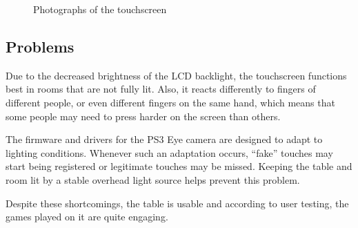 \documentclass[a4paper,12pt]{article}
\begin{document}
\begin{figure}[p]\small
{}
\hspace{1em}
\caption{Photographs of the touchscreen}
\end{figure}

\subsection{Problems}

Due to the decreased brightness of the LCD backlight, the touchscreen functions
best in rooms that are not fully lit.
Also, it reacts differently to fingers of different people, or even different
fingers on the same hand, which means that some people may need to press harder
on the screen than others.

The firmware and drivers for the PS3 Eye camera are designed to adapt to
lighting conditions.
Whenever such an adaptation occurs, “fake” tou\-ches may start being registered
or legitimate touches may be missed.
Keeping the table and room lit by a stable overhead light source helps prevent
this problem.

Despite these shortcomings, the table is usable and according to user testing,
the games played on it are quite engaging.

\newpage

\tableofcontents

\listoffigures
\end{document}

